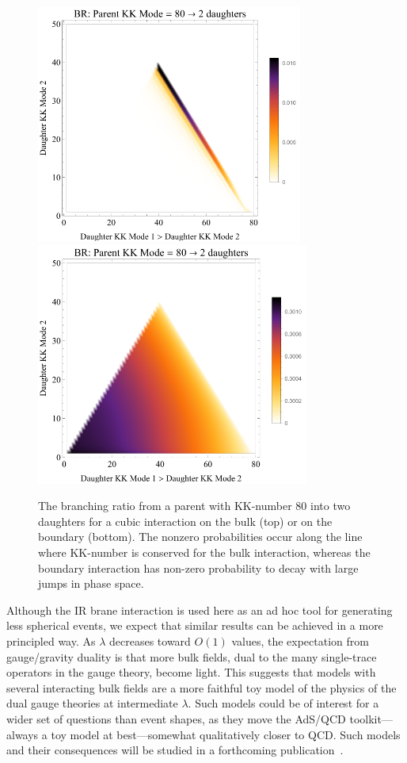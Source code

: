 \begin{figure}[tb!]
	\centering
	\includegraphics[width=0.78\textwidth]{figures/DS_KKBR_bulk.pdf}\vspace{1cm}
	\includegraphics[width=0.8\textwidth]{figures/DS_KKBR_boundary.pdf}
	\caption{The branching ratio from a parent with KK-number 80 into two daughters for a cubic interaction on the bulk (top) or on the boundary (bottom). The nonzero probabilities occur along the line where KK-number is conserved for the bulk interaction, whereas the boundary interaction has non-zero probability to decay with large jumps in phase space. }
	\label{fig:BR}
\end{figure}

Although the IR brane interaction is used here as an ad hoc tool for generating less spherical events, we expect that similar results can be achieved in a more principled way. As $\lambda$ decreases toward $O(1)$ values, the expectation from gauge/gravity duality is that more bulk fields, dual to the many single-trace operators in the gauge theory, become light. This suggests that models with several interacting bulk fields are a more faithful toy model of the physics of the dual gauge theories at intermediate $\lambda$. Such models could be of interest for a wider set of questions than event shapes, as they move the AdS/QCD toolkit---always a toy model at best---somewhat qualitatively closer to QCD. Such models and their consequences will be studied in a forthcoming publication~\cite{showersinprogress}. 

